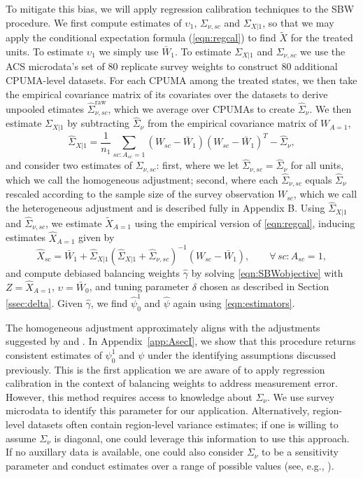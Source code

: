 \documentclass[aoas]{imsart}
\theoremstyle{plain}
\theoremstyle{remark}
\begin{document}
To mitigate this bias, we will apply regression calibration techniques to the SBW procedure. We first compute estimates of $\upsilon_1$, $\Sigma_{\nu, sc}$ and $\Sigma_{X|1}$, so that we may apply the conditional expectation formula (\ref{eqn:regcal}) to find $\tilde{X}$ for the treated units. To estimate $\upsilon_1$ we simply use $\bar{W}_1$. To estimate $\Sigma_{X|1}$ and $\Sigma_{\nu,sc}$ we use the ACS microdata's set of 80 replicate survey weights to construct 80 additional CPUMA-level datasets. For each CPUMA among the treated states, we then take the empirical covariance matrix of its covariates over the datasets to derive unpooled etimates $\hat{\Sigma}_{\nu,sc}^{\text{raw}}$, which we average over CPUMAs to create $\hat{\Sigma}_{\nu}$. We then estimate $\Sigma_{X|1}$ by subtracting $\hat{\Sigma}_{\nu}$ from the empirical covariance matrix of $W_{A=1}$,
\[ \hat{\Sigma}_{X|1} = \frac{1}{n_1} \sum_{sc:A_{sc}=1} (W_{sc} - \bar{W}_1)(W_{sc} - \bar{W}_1)^T - \hat{\Sigma}_{\nu},\]
and consider two estimates of $\Sigma_{\nu, sc}$: first, where we let $\hat{\Sigma}_{\nu,sc} = \hat{\Sigma}_{\nu}$ for all units, which we call the homogeneous adjustment; second, where each $\hat{\Sigma}_{\nu, sc}$ equals $\hat{\Sigma}_{\nu}$ rescaled according to the sample size of the survey observation $W_{sc}$, which we call the heterogeneous adjustment and is described fully in Appendix B. Using $\hat{\Sigma}_{X|1}$ and $\hat{\Sigma}_{\nu, sc}$, we estimate $\tilde{X}_{A=1}$ using the empirical version of \eqref{eqn:regcal}, inducing estimates $\hat{X}_{A=1}$ given by
\begin{equation}\label{eqn:hatX}
\hat{X}_{sc} = \bar{W}_1 + \hat{\Sigma}_{X|1} (\hat{\Sigma}_{X|1} + \hat{\Sigma}_{\nu,sc})^{-1}  (W_{sc} - \bar{W}_1), \qquad \forall\, sc: A_{sc}=1,
\end{equation}
and compute debiased balancing weights $\hat{\gamma}$ by solving \eqref{eqn:SBWobjective} with $Z = \hat{X}_{A=1}$, $\upsilon = \bar{W}_0$, and tuning parameter $\delta$ chosen as described in Section \ref{ssec:delta}. Given $\hat{\gamma}$, we find $\hat{\psi}_0^1$ and $\hat{\psi}$ again using \eqref{eqn:estimators}. 

The homogeneous adjustment approximately aligns with the adjustments suggested by \cite{carroll2006measurement} and \cite{gleser1992importance}. In Appendix~\ref{app:AsecI}, we show that this procedure returns consistent estimates of $\psi_0^1$ and $\psi$ under the identifying assumptions discussed previously. This is the first application we are aware of to apply regression calibration in the context of balancing weights to address measurement error. However, this method requires access to knowledge about $\Sigma_{\nu}$. We use survey microdata to identify this parameter for our application. Alternatively, region-level datasets often contain region-level variance estimates; if one is willing to assume $\Sigma_{\nu}$ is diagonal, one could leverage this information to use this approach. If no auxillary data is available, one could also consider $\Sigma_{\nu}$ to be a sensitivity parameter and conduct estimates over a range of possible values (see, e.g., \cite{illenberger2020impact}). 
\end{document}
